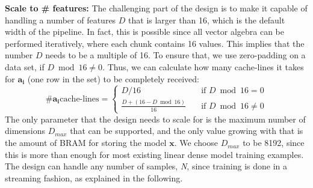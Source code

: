 \documentclass{article}
\begin{document}
\noindent
\textbf{Scale to \# features:} The challenging part of the design is to make it capable of handling a number of features $D$ that is larger than 16, which is the default width of the pipeline. In fact, this is possible since all vector algebra can be performed iteratively, where each chunk contains 16 values. This implies that the number $D$ needs to be a multiple of 16. To ensure that, we use zero-padding on a data set, if $D\bmod16\neq0$. Thus, we can calculate how many cache-lines it takes for $\mathbf{a_i}$ (one row in the set) to be completely received:
\[
\text{\#} \mathbf{a_i} \text{cache-lines} = 
\begin{cases}
D/16
\quad & \text{if } D\bmod16=0 \\
\frac{D + (16-D\bmod16)}{16}
\quad & \text{if } D\bmod16\neq0
\end{cases}
\]
The only parameter that the design needs to scale for is the maximum number of dimensions $D_{max}$ that can be supported, and the only value growing with that is the amount of BRAM for storing the model $\mathbf{x}$. We choose $D_{max}$ to be 8192, since this is more than enough for most existing linear dense model training examples. The design can handle any number of samples, \textit{N}, since training is done in a streaming fashion, as explained in the following.
\end{document}
